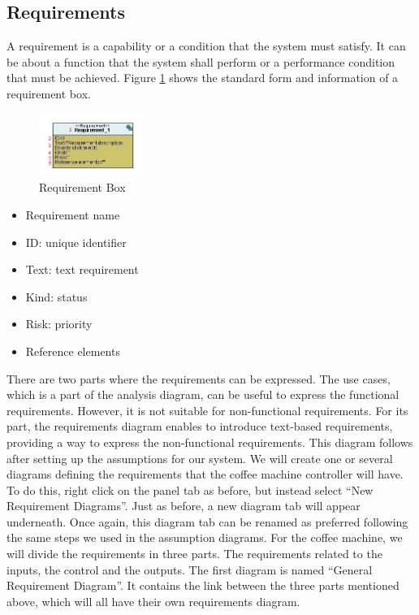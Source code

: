 \documentclass[12pt]{article}
\begin{document}
\subsection{Requirements}
A requirement is a capability or a condition that the system must satisfy. It can be about a function that the system shall perform or a performance condition that must be achieved. Figure \ref{fig:reqbox} shows the standard form and information of a requirement box.

\begin{figure}[htbp]
\centering
\includegraphics[width=0.3\textwidth]{fig/reqbox.jpg}
\caption{Requirement Box} \label{fig:reqbox}
\end{figure}

\begin{itemize}
\item Requirement name
\item ID: unique identifier
\item Text: text requirement
\item Kind: status
\item Risk: priority
\item Reference elements
\end{itemize}

There are two parts where the requirements can be expressed. The use cases, which is a part of the analysis diagram, can be useful to express the functional requirements. However, it is not suitable for non-functional requirements. For its part, the requirements diagram enables to introduce text-based requirements, providing a way to express the non-functional requirements. This diagram follows after setting up the assumptions for our system.
	We will create one or several diagrams defining the requirements that the coffee machine controller will have. To do this, right click on the panel tab as before, but instead select “New Requirement Diagrams”. Just as before, a new diagram tab will appear underneath. Once again, this diagram tab can be renamed as preferred following the same steps we used in the assumption diagrams.
	For the coffee machine, we will divide the requirements in three parts. The requirements related to the inputs, the control and the outputs.
	The first diagram is named ``General Requirement Diagram''. It contains the link between the three parts mentioned above, which will all have their own requirements diagram. 
	
\end{document}
